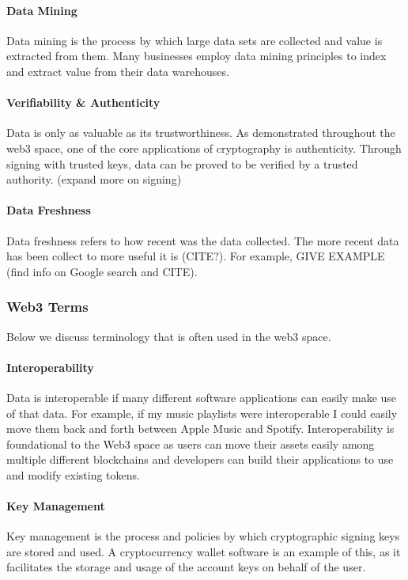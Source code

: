 \paragraph{Data Mining}
Data mining is the process by which large data sets are collected and value is extracted from them. Many businesses employ data mining principles to index and extract value from their data warehouses.

\paragraph{Verifiability \& Authenticity}
Data is only as valuable as its trustworthiness. As demonstrated throughout the web3 space, one of the core applications of cryptography is authenticity. Through signing with trusted keys, data can be proved to be verified by a trusted authority. (expand more on signing)

\paragraph{Data Freshness}
Data freshness refers to how recent was the data collected. The more recent data has been collect to more useful it is (CITE?). For example, GIVE EXAMPLE (find info on Google search and CITE).

\subsubsection{Web3 Terms}
Below we discuss terminology that is often used in the web3 space.

\paragraph{Interoperability}
Data is interoperable if many different software applications can easily make use of that data. For example, if my music playlists were interoperable I could easily move them back and forth between Apple Music and Spotify. Interoperability is foundational to the Web3 space as users can move their assets easily among multiple different blockchains and developers can build their applications to use and modify existing tokens.

\paragraph{Key Management}
Key management is the process and policies by which cryptographic signing keys are stored and used. A cryptocurrency wallet software is an example of this, as it facilitates the storage and usage of the account keys on behalf of the user.

